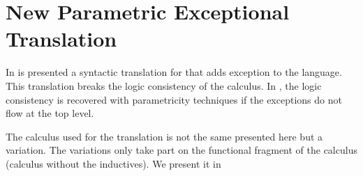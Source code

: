\chapter{New Parametric Exceptional Translation}
\label{ch:translation}


\newcommand{\FreeVar}[1]{\mathtexttt{FreeVar}(#1)}

\newcommand{\ExceptionType}{\ensuremath{\mathbb{E}}}
\newcommand{\BExceptionType}{\text{\rmfamily \textbf{E}}}

\newcommand{\raiseFun}{\mathtexttt{raise}}
\newcommand{\unit}{\mathtexttt{unit}}
\newcommand{\ttUnit}{\mathtexttt{tt}}
\newcommand{\eqRefl}{\mathtexttt{refl}}


\renewcommand{\CicType}{\textsc{Type}}
\renewcommand{\CicProp}{\textsc{Prop}}
\newcommand{\CicWeak}{\textsc{Weakening}}
\newcommand{\CicTypeProd}{\textsc{Type-Prod}}
\newcommand{\CicPropProd}{\textsc{Prop-Prod}}
\newcommand{\CicImpred}{\textsc{Impred}}
\renewcommand{\CicConv}{\textsc{Conv}}
\newcommand{\CicAbs}{\textsc{Abs}}
\renewcommand{\CicApp}{\textsc{App}}
\newcommand{\CicIdem}{\textsc{Idem}}
\newcommand{\CicWfnil}{\textsc{Wf-Empty}}
\newcommand{\CicWfcons}{\textsc{Wf-Cons}}

In  is presented a syntactic translation for \CIC{} that adds exception to the 
language. This translation breaks the logic consistency of the calculus. In ,
the logic consistency is recovered with parametricity techniques if the exceptions do not
flow at the top level.

The calculus used for the translation is not the same presented here but a variation. The 
variations only take part on the functional fragment of the calculus (calculus without the inductives).
We present it in 

